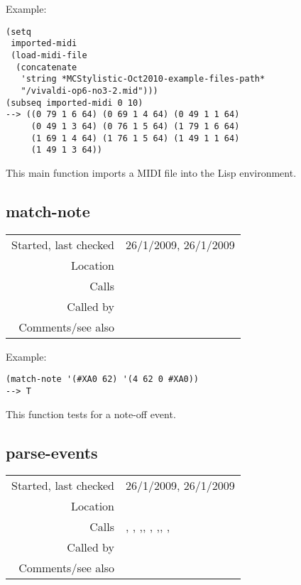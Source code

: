 \vspace{0.5cm}
\noindent Example:
\begin{verbatim}
(setq
 imported-midi
 (load-midi-file
  (concatenate
   'string *MCStylistic-Oct2010-example-files-path*
   "/vivaldi-op6-no3-2.mid")))
(subseq imported-midi 0 10)
--> ((0 79 1 6 64) (0 69 1 4 64) (0 49 1 1 64)
     (0 49 1 3 64) (0 76 1 5 64) (1 79 1 6 64)
     (1 69 1 4 64) (1 76 1 5 64) (1 49 1 1 64)
     (1 49 1 3 64))
\end{verbatim}

\noindent This main function imports a MIDI file
into the Lisp environment.


\subsection*{match-note}\label{fun:match-note}

\vspace{0.3cm}
\begin{tabular}{r|p{8cm}}
Started, last checked & 26/1/2009, 26/1/2009 \\
Location & \nameref{sec:MIDI-import} \\
Calls & \\
Called by & \nameref{fun:handle-off} \\
Comments/see also &
\end{tabular}

\vspace{0.5cm}
\noindent Example:
\begin{verbatim}
(match-note '(#XA0 62) '(4 62 0 #XA0))
--> T
\end{verbatim}

\noindent This function tests for a note-off event.


\subsection*{parse-events}\label{fun:parse-events}

\vspace{0.3cm}
\begin{tabular}{r|p{8cm}}
Started, last checked & 26/1/2009, 26/1/2009 \\
Location & \nameref{sec:MIDI-import} \\
Calls & \nameref{fun:handle-bend}, \nameref{fun:handle-control}, \nameref{fun:handle-note},\newline \nameref{fun:handle-off}, \nameref{fun:handle-pressure}, \nameref{fun:handle-program},\newline \nameref{fun:handle-touch}, \nameref{fun:parse-metadata}, \nameref{fun:strip-sysex} \\
Called by & \nameref{fun:read-and-parse-event} \\
Comments/see also &
\end{tabular}

